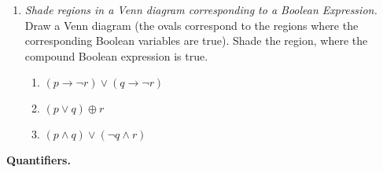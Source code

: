 \documentclass[a4paper,12pt]{article}
\begin{document}
\begin{enumerate}
\item {\small \em
Shade regions in a Venn diagram corresponding to a Boolean Expression.}\\
Draw a Venn diagram (the ovals correspond to the regions where
the corresponding Boolean variables are true).
Shade the region, where the compound Boolean expression is true.
\begin{enumerate}
\item $(p \rightarrow \neg r) \vee (q \rightarrow \neg r)$
\item $(p \vee q) \oplus r$
\item $(p \wedge q) \vee (\neg q \wedge r)$
\end{enumerate}
\end{enumerate}



\vspace{10pt}
{\bf Quantifiers.}
\end{document}

